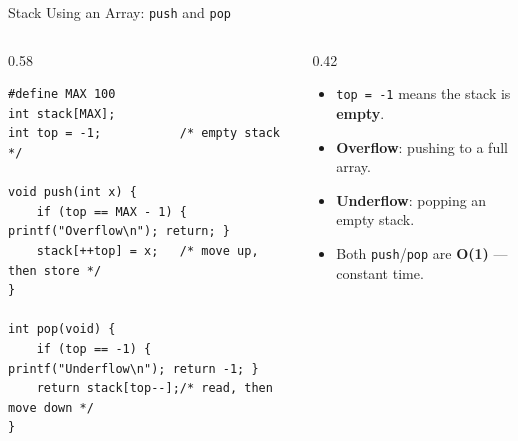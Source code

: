 \documentclass[aspectratio=169]{beamer}
\begin{document}
	\begin{frame}[fragile]{Stack Using an Array: \texttt{push} and \texttt{pop}}
		\begin{columns}[T]
			\begin{column}{0.58\textwidth}
				\begin{lstlisting}
#define MAX 100
int stack[MAX];
int top = -1;           /* empty stack */

void push(int x) {
    if (top == MAX - 1) { printf("Overflow\n"); return; }
    stack[++top] = x;   /* move up, then store */
}

int pop(void) {
    if (top == -1) { printf("Underflow\n"); return -1; }
    return stack[top--];/* read, then move down */
}
				\end{lstlisting}
			\end{column}
			\begin{column}{0.42\textwidth}
				\begin{itemize}\small
					\item \texttt{top = -1} means the stack is \textbf{empty}.
					\item \textbf{Overflow}: pushing to a full array.
					\item \textbf{Underflow}: popping an empty stack.
					\item Both \texttt{push}/\texttt{pop} are \textbf{O(1)} --- constant time.
				\end{itemize}
			\end{column}
		\end{columns}
	\end{frame}

\end{document}
